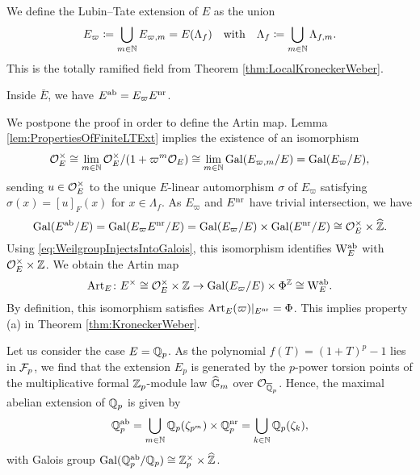 \documentclass[../main.tex]{subfiles}
\begin{document}
We define the Lubin--Tate extension of $E$ as the union
\begin{equation*}
  E_\varpi \coloneq \bigcup_{m \in \mathbb{N}} E_{\varpi, m} = E(\Lambda_f) \quad
  \text{with} \quad \Lambda_f \coloneqq \bigcup_{m \in \mathbb{N}} \Lambda_{f,m}.
\end{equation*}
This is the totally ramified field from Theorem \ref{thm:LocalKroneckerWeber}.
\begin{thm}\label{thm:LocalKW}
  Inside $\bar E$, we have $E^{\mathrm{ab}} = E_\varpi E^{\mathrm{nr}}$.
\end{thm}
We postpone the proof in order to define the Artin map. Lemma
\ref{lem:PropertiesOfFiniteLTExt} implies the existence of an isomorphism
\begin{equation*}
  \mathcal{O}_E^\times \cong \lim_{m \in \mathbb{N}} \mathcal{O}_E^\times/(1 + \varpi^m \mathcal{O}_E) \cong
  \lim_{m \in \mathbb{N}} \operatorname{Gal}(E_{\varpi,m}/E) = \operatorname{Gal}(E_\varpi/E),
\end{equation*}
sending $u \in \mathcal{O}_E^\times$ to the unique $E$-linear automorphism $\sigma$ of
$E_\varpi$ satisfying $\sigma(x) = [u]_F(x)$ for $x \in \Lambda_f$. 
As $E_\varpi$ and $E^{\mathrm{nr}}$ have trivial intersection, we have
\begin{equation*}
  \operatorname{Gal}(E^{\mathrm{ab}} /E) = \operatorname{Gal}(E_\varpi E^{\mathrm{nr}} / E) = \operatorname{Gal}(E_\varpi/E) \times
  \operatorname{Gal}(E^{\mathrm{nr}} /E) \cong \mathcal{O}_E^\times \times \widehat {\mathbb{Z}}.
\end{equation*}
Using \eqref{eq:WeilgroupInjectsIntoGalois}, this isomorphism
identifies $\mathrm W_E^{\mathrm{ab}}$ with $\mathcal{O}_E^\times \times \mathbb{Z}$. We obtain the Artin map
\begin{equation*}
  \mathrm{Art}_E\colon E^\times \cong \mathcal{O}_E^\times \times \mathbb{Z} \to 
  \operatorname{Gal}(E_\varpi/E) \times \Phi^{\mathbb{Z}} \cong \mathrm W_E^{\mathrm{ab}}.
\end{equation*}
By definition, this isomorphism satisfies 
$\mathrm{Art}_E(\varpi)|_{E^{\mathrm{nr}}} = \Phi$. This implies property (a) in 
Theorem \ref{thm:KroneckerWeber}. 

\begin{xpl}
  Let us consider the case $E = \mathbb{Q}_p$. As the polynomial 
  $f(T) = (1+T)^p - 1$ lies in $\mathcal{F}_p$, we find that the extension $E_p$ is generated
  by the $p$-power torsion points of the multiplicative formal $\mathbb{Z}_p$-module law
  $\widehat{\mathbb{G}}_m$ over $\mathcal{O}_{\overline {\mathbb{Q}}_p}$.
  Hence, the maximal abelian extension of $\mathbb{Q}_p$ is given by 
  \begin{equation*}
    \mathbb{Q}_p^{\mathrm{ab}} = \bigcup_{m \in \mathbb{N}} \mathbb{Q}_p(\zeta_{p^m}) \times \mathbb{Q}_p^{\mathrm{nr}}
             = \bigcup_{k \in \mathbb{N}} \mathbb{Q}_p(\zeta_k),
  \end{equation*}
  with Galois group $\operatorname{Gal}(\mathbb{Q}_p^{\mathrm{ab}} /\mathbb{Q}_p) \cong \mathbb{Z}_p^\times \times \widehat {\mathbb{Z}}$. 
\end{xpl}
\end{document}
